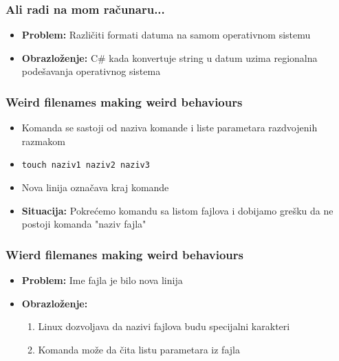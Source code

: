 \documentclass{beamer}
\begin{document}
\begin{frame}
    \frametitle{Ali radi na mom računaru...}
    \begin{itemize}
        \item \textbf{Problem:} Različiti formati datuma na samom operativnom sistemu \newline
        \item \textbf{Obrazloženje:} C\# kada konvertuje string u datum uzima regionalna podešavanja operativnog sistema \newline
    \end{itemize}
\end{frame}

\begin{frame}
\frametitle{Weird filenames making weird behaviours}
\begin{itemize}
    \item Komanda se sastoji od naziva komande i liste parametara razdvojenih razmakom \newline
    \item \lstinline|touch naziv1 naziv2 naziv3| \newline
    \item Nova linija označava kraj komande \newline
    \item \textbf{Situacija:} Pokrećemo komandu sa listom fajlova i dobijamo grešku da ne postoji komanda "naziv fajla" \newline
        
\end{itemize}
\end{frame}

\begin{frame}
    \frametitle{Wierd filemanes making weird behaviours}
    \begin{itemize}
        \item \textbf{Problem:} Ime fajla je bilo nova linija \newline
        \item \textbf{Obrazloženje: } \begin{enumerate}
            \item Linux dozvoljava da nazivi fajlova budu specijalni karakteri \newline
            \item Komanda može da čita listu parametara iz fajla
        \end{enumerate}
    \end{itemize}
\end{frame}
\end{document}
